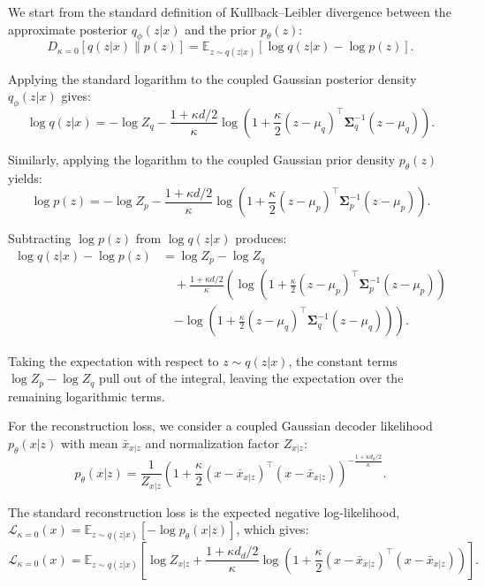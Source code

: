 \documentclass[twoside,11pt]{article}
\renewenvironment{proof}{\par\noindent{\bf Proof\ }}{\hfill\BlackBox\par\vspace{2mm}}
\begin{document}
\begin{proof}
We start from the standard definition of Kullback--Leibler divergence between the approximate posterior $q_\phi(z|x)$ and the prior $p_\theta(z)$:
\begin{equation}
D_{\kappa=0}[q(z|x) \parallel p(z)] = \mathbb{E}_{z \sim q(z|x)} \left[ \log q(z|x) - \log p(z) \right].
\end{equation}

Applying the standard logarithm to the coupled Gaussian posterior density $q_\phi(z|x)$ gives:
\begin{equation}
\log q(z|x) = -\log Z_q - \frac{1 + \kappa d/2}{\kappa} \log \left( 1 + \frac{\kappa}{2} (z - \mu_q)^\top \boldsymbol{\Sigma}_q^{-1} (z - \mu_q) \right).
\end{equation}

Similarly, applying the logarithm to the coupled Gaussian prior density $p_\theta(z)$ yields:
\begin{equation}
\log p(z) = -\log Z_p - \frac{1 + \kappa d/2}{\kappa} \log \left( 1 + \frac{\kappa}{2} (z - \mu_p)^\top \boldsymbol{\Sigma}_p^{-1} (z - \mu_p) \right).
\end{equation}

Subtracting $\log p(z)$ from $\log q(z|x)$ produces:
\begin{equation}
\begin{aligned}
\log q(z|x) - \log p(z) &= \log Z_p - \log Z_q \\
&\quad + \frac{1 + \kappa d/2}{\kappa} \left( \log \left( 1 + \frac{\kappa}{2} (z - \mu_p)^\top \boldsymbol{\Sigma}_p^{-1} (z - \mu_p) \right) \right. \\
&\quad \left. - \log \left( 1 + \frac{\kappa}{2} (z - \mu_q)^\top \boldsymbol{\Sigma}_q^{-1} (z - \mu_q) \right) \right).
\end{aligned}
\end{equation}

Taking the expectation with respect to $z \sim q(z|x)$, the constant terms $\log Z_p - \log Z_q$ pull out of the integral, leaving the expectation over the remaining logarithmic terms.

For the reconstruction loss, we consider a coupled Gaussian decoder likelihood $p_\theta(x|z)$ with mean $\bar{x}_{x|z}$ and normalization factor $Z_{x|z}$:
\begin{equation}
p_\theta(x|z) = \frac{1}{Z_{x|z}} \left( 1 + \frac{\kappa}{2} (x - \bar{x}_{x|z})^\top (x - \bar{x}_{x|z}) \right)^{-\frac{1 + \kappa d_d/2}{\kappa}}.
\end{equation}

The standard reconstruction loss is the expected negative log-likelihood, $\mathcal{L}_{\kappa=0}(x) = \mathbb{E}_{z \sim q(z|x)} [ -\log p_\theta(x|z) ]$, which gives:
\begin{equation}
\mathcal{L}_{\kappa=0}(x) = \mathbb{E}_{z \sim q(z|x)} \left[ \log Z_{x|z} + \frac{1 + \kappa d_d/2}{\kappa} \log \left( 1 + \frac{\kappa}{2} (x - \bar{x}_{x|z})^\top (x - \bar{x}_{x|z}) \right) \right].
\end{equation}
\end{proof}
\end{document}
